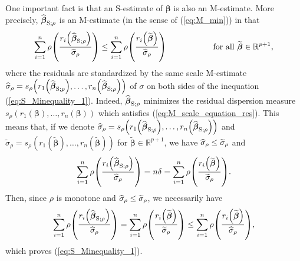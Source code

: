 One important fact is that an S-estimate of $\boldsymbol\beta$ is also an
M-estimate. More precisely, $\widehat{\boldsymbol\beta}_{\mathrm{S};\rho}$
is an M-estimate (in the sense of (\ref{eq:M_min})) in that
\begin{equation}
\sum_{i=1}^{n}\rho\left(  \frac{r_{i}\left(  \sthat{\boldsymbol\beta%
}_{\mathrm{S};\rho}\right)  }{\sthat{\sigma}_{\rho}}\right)  \leq\sum
_{i=1}^{n}\rho\left(  \frac{r_{i}\left(  \widetilde{\boldsymbol\beta%
}\right)  }{\sthat{\sigma}_{\rho}}\right)  \hspace{2cm}\text{for all
}\widetilde{\boldsymbol\beta}\in\mathbb{R}^{p+1}, \label{eq:S_Minequality_1}%
\end{equation}
where the residuals are standardized by the same scale M-estimate
$\sthat{\sigma}_{\rho}=s_{\rho}\left(  r_{1}\left(  \widehat
{\boldsymbol\beta}_{\mathrm{S};\rho}\right)  ,\ldots,r_{n}\left(
\sthat{\boldsymbol\beta}_{\mathrm{S};\rho}\right)  \right)  $ of $\sigma$
on both sides of the inequation (\ref{eq:S_Minequality_1}). Indeed,
$\widehat{\boldsymbol\beta}_{\mathrm{S};\rho}$ minimizes the residual
dispersion measure $s_{\rho}\left(  r_{1}(\boldsymbol\beta),\ldots
,r_{n}(\boldsymbol\beta)\right)  $ which satisfies
(\ref{eq:M_scale_equation_res}). This means that, if we denote $\widehat
{\sigma}_{\rho}=s_{\rho}\left(  r_{1}\left(  \sthat{\boldsymbol\beta%
}_{\mathrm{S};\rho}\right)  ,\ldots,r_{n}\left(  \sthat{\boldsymbol\beta%
}_{\mathrm{S};\rho}\right)  \right)  $ and $\widetilde{\sigma}_{\rho}=s_{\rho
}\left(  r_{1}\left(  \widetilde{\boldsymbol\beta}\right)  ,\ldots
,r_{n}\left(  \widetilde{\boldsymbol\beta}\right)  \right)  $ for
$\widetilde{\boldsymbol\beta}\in\mathbb{R}^{p+1}$, we have $\widehat{\sigma
}_{\rho}\leq\widetilde{\sigma}_{\rho}$ and
\[
\sum_{i=1}^{n}\rho\left(  \frac{r_{i}\left(  \sthat{\boldsymbol\beta%
}_{\mathrm{S};\rho}\right)  }{\sthat{\sigma}_{\rho}}\right)  =n\delta
=\sum_{i=1}^{n}\rho\left(  \frac{r_{i}\left(  \widetilde{\boldsymbol\beta%
}\right)  }{\widetilde{\sigma}_{\rho}}\right)  .
\]
Then, since $\rho$ is monotone and $\widehat{\sigma}_{\rho}\leq\widetilde
{\sigma}_{\rho}$, we necessarily have
\[
\sum_{i=1}^{n}\rho\left(  \frac{r_{i}\left(  \sthat{\boldsymbol\beta%
}_{\mathrm{S};\rho}\right)  }{\sthat{\sigma}_{\rho}}\right)  =\sum_{i=1}%
^{n}\rho\left(  \frac{r_{i}\left(  \widetilde{\boldsymbol\beta}\right)
}{\widetilde{\sigma}_{\rho}}\right)  \leq\sum_{i=1}^{n}\rho\left(  \frac
{r_{i}\left(  \widetilde{\boldsymbol\beta}\right)  }{\sthat{\sigma}_{\rho
}}\right)  ,
\]
which proves (\ref{eq:S_Minequality_1}).

